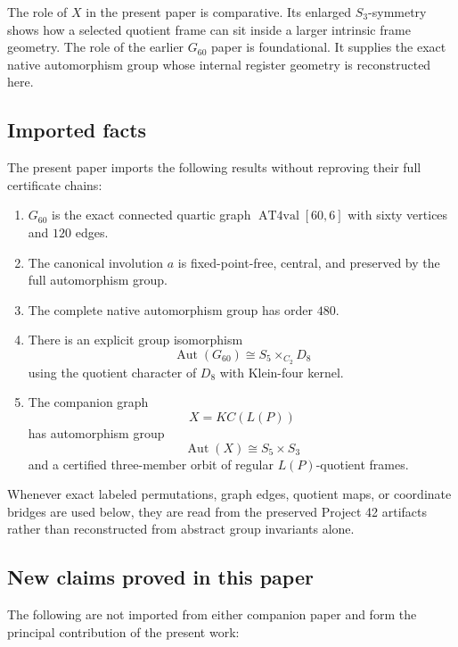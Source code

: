 The role of \(X\) in the present paper is comparative. Its enlarged
\(S_3\)-symmetry shows how a selected quotient frame can sit inside a
larger intrinsic frame geometry. The role of the earlier \(G_{60}\)
paper is foundational. It supplies the exact native automorphism group
whose internal register geometry is reconstructed here.

\subsection{Imported facts}

The present paper imports the following results without reproving their
full certificate chains:

\begin{enumerate}
    \item \(G_{60}\) is the exact connected quartic graph
    \(\operatorname{AT4val}[60,6]\) with sixty vertices and
    \(120\) edges.

    \item The canonical involution \(a\) is fixed-point-free,
    central, and preserved by the full automorphism group.

    \item The complete native automorphism group has order \(480\).

    \item There is an explicit group isomorphism
    \[
    \operatorname{Aut}(G_{60})
    \cong
    S_5\times_{C_2}D_8
    \]
    using the quotient character of \(D_8\) with Klein-four kernel.

    \item The companion graph
    \[
    X=KC(L(P))
    \]
    has automorphism group
    \[
    \operatorname{Aut}(X)\cong S_5\times S_3
    \]
    and a certified three-member orbit of regular
    \(L(P)\)-quotient frames.
\end{enumerate}

Whenever exact labeled permutations, graph edges, quotient maps, or
coordinate bridges are used below, they are read from the preserved
Project 42 artifacts rather than reconstructed from abstract group
invariants alone.

\subsection{New claims proved in this paper}

The following are not imported from either companion paper and form
the principal contribution of the present work:

